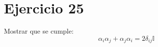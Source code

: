 \section*{Ejercicio 25}
Mostrar que se cumple:
\begin{equation*}
    \alpha_i \alpha_j + \alpha_j \alpha_i = 2 \delta_{ij} \mathbb{I}
\end{equation*}